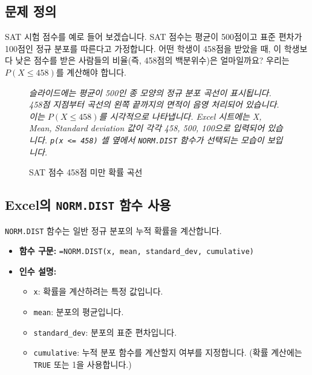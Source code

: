 \documentclass[11pt,a4paper]{book}
\theoremstyle{definition}
\begin{document}
\subsection{문제 정의}
SAT 시험 점수를 예로 들어 보겠습니다. SAT 점수는 평균이 500점이고 표준 편차가 100점인 정규 분포를 따른다고 가정합니다.
어떤 학생이 458점을 받았을 때, 이 학생보다 낮은 점수를 받은 사람들의 비율(즉, 458점의 백분위수)은 얼마일까요?
우리는 $P(X \le 458)$를 계산해야 합니다.

\begin{figure}[h!]
    \centering
    \caption{SAT 점수 458점 미만 확률 곡선}
    \label{fig:sat_less_than}
    \vspace{0.5em}
    \textit{슬라이드에는 평균이 500인 종 모양의 정규 분포 곡선이 표시됩니다. 458점 지점부터 곡선의 왼쪽 끝까지의 면적이 음영 처리되어 있습니다. 이는 $P(X \le 458)$를 시각적으로 나타냅니다. Excel 시트에는 X, Mean, Standard deviation 값이 각각 458, 500, 100으로 입력되어 있습니다. \texttt{p(x <= 458)} 셀 옆에서 \texttt{NORM.DIST} 함수가 선택되는 모습이 보입니다.}
\end{figure}

\subsection{Excel의 \texttt{NORM.DIST} 함수 사용}
\texttt{NORM.DIST} 함수는 일반 정규 분포의 누적 확률을 계산합니다.

\begin{itemize}
    \item \textbf{함수 구문:} \texttt{=NORM.DIST(x, mean, standard\_dev, cumulative)}
    \item \textbf{인수 설명:}
    \begin{itemize}
        \item \texttt{x}: 확률을 계산하려는 특정 값입니다.
        \item \texttt{mean}: 분포의 평균입니다.
        \item \texttt{standard\_dev}: 분포의 표준 편차입니다.
        \item \texttt{cumulative}: 누적 분포 함수를 계산할지 여부를 지정합니다. (확률 계산에는 \texttt{TRUE} 또는 1을 사용합니다.)
    \end{itemize}
\end{itemize}
\end{document}
